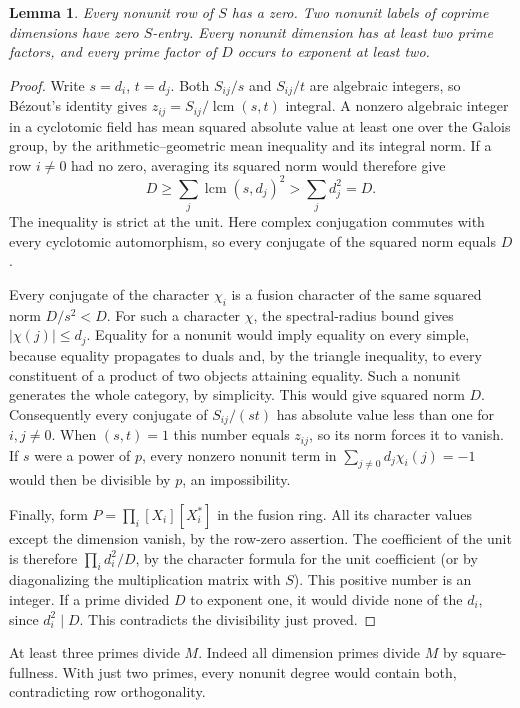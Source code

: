 \documentclass[11pt]{amsart}
\numberwithin{equation}{section}
\newtheorem{lemma}[theorem]{Lemma}
\begin{document}
\begin{lemma}\label{lem:basic-table}
Every nonunit row of $S$ has a zero. Two nonunit labels of coprime dimensions have zero $S$-entry. Every nonunit dimension has at least two prime factors, and every prime factor of $D$ occurs to exponent at least two.
\end{lemma}
\begin{proof}
Write $s=d_i$, $t=d_j$. Both $S_{ij}/s$ and $S_{ij}/t$ are algebraic integers, so B\'ezout's identity gives $z_{ij}=S_{ij}/\operatorname{lcm}(s,t)$ integral. A nonzero algebraic integer in a cyclotomic field has mean squared absolute value at least one over the Galois group, by the arithmetic--geometric mean inequality and its integral norm. If a row $i\ne0$ had no zero, averaging its squared norm would therefore give
\[
 D\ge\sum_j\operatorname{lcm}(s,d_j)^2>\sum_j d_j^2=D.
\]
The inequality is strict at the unit. Here complex conjugation commutes with every cyclotomic automorphism, so every conjugate of the squared norm equals $D$.

Every conjugate of the character $\chi_i$ is a fusion character of the same squared norm $D/s^2<D$. For such a character $\chi$, the spectral-radius bound gives $|\chi(j)|\le d_j$. Equality for a nonunit would imply equality on every simple, because equality propagates to duals and, by the triangle inequality, to every constituent of a product of two objects attaining equality. Such a nonunit generates the whole category, by simplicity. This would give squared norm $D$. Consequently every conjugate of $S_{ij}/(st)$ has absolute value less than one for $i,j\ne0$. When $(s,t)=1$ this number equals $z_{ij}$, so its norm forces it to vanish. If $s$ were a power of $p$, every nonzero nonunit term in $\sum_{j\ne0}d_j\chi_i(j)=-1$ would then be divisible by $p$, an impossibility.

Finally, form $P=\prod_i[X_i][X_i^*]$ in the fusion ring. All its character values except the dimension vanish, by the row-zero assertion. The coefficient of the unit is therefore $\prod_i d_i^2/D$, by the character formula for the unit coefficient (or by diagonalizing the multiplication matrix with $S$). This positive number is an integer. If a prime divided $D$ to exponent one, it would divide none of the $d_i$, since $d_i^2\mid D$. This contradicts the divisibility just proved.
\end{proof}


At least three primes divide $M$. Indeed all dimension primes divide $M$ by square-fullness. With just two primes, every nonunit degree would contain both, contradicting row orthogonality.
\end{document}
